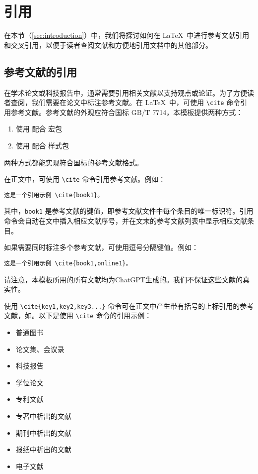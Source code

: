 \section{引用}\label{sec:reference}

在本节（{\ref{sec:introduction}}）中，我们将探讨如何在 \LaTeX\ 中进行参考文献引用和交叉引用，以便于读者查阅文献和方便地引用文档中的其他部分。

\subsection{参考文献的引用}

在学术论文或科技报告中，通常需要引用相关文献以支持观点或论证。为了方便读者查阅，我们需要在论文中标注参考文献。在 \LaTeX\ 中，可使用 \verb|\cite| 命令引用参考文献。参考文献的外观应符合国标 GB/T 7714，本模板提供两种方式：
\begin{enumerate}
    \item 使用 \BibTeX{} 配合  宏包
    \item 使用 \BibLaTeX{} 配合  样式包
\end{enumerate}
两种方式都能实现符合国标的参考文献格式。

在正文中，可使用 \verb|\cite| 命令引用参考文献。例如：

\begin{Verbatim}
这是一个引用示例 \cite{book1}。
\end{Verbatim}

其中，\verb|book1| 是参考文献的键值，即参考文献文件中每个条目的唯一标识符。引用命令会自动在文中插入相应文献序号，并在文末的参考文献列表中显示相应文献条目。

如果需要同时标注多个参考文献，可使用逗号分隔键值。例如：

\begin{Verbatim}
这是一个引用示例 \cite{book1,online1}。
\end{Verbatim}

请注意，本模板所用的所有文献均为ChatGPT生成的。我们不保证这些文献的真实性。

使用 \verb|\cite{key1,key2,key3...}| 命令可在正文中产生带有括号的上标引用的参考文献，如\cite{book1,online1,article1}。以下是使用 \verb|\cite| 命令的引用示例：
\begin{itemize}
  \item 普通图书\cite{book1,book2}
  \item 论文集、会议录\cite{conf1,conf2}
  \item 科技报告\cite{techreport1,techreport2}
  \item 学位论文\cite{thesis1,thesis2,thesis3}
  \item 专利文献\cite{patent1,patent2}
  \item 专著中析出的文献\cite{inbook1,inbook2}
  \item 期刊中析出的文献\cite{qin2021,article1,article2}
  \item 报纸中析出的文献\cite{newspaper1,newspaper2}
  \item 电子文献\cite{online1,online2,online3}
\end{itemize}

